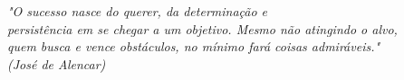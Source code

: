 \begin{epigrafe}
    \vspace*{\fill}
	\begin{flushright}
		\textit{"O sucesso nasce do querer, da determinação e \\persistência em se chegar a um objetivo. Mesmo não atingindo o alvo, \\quem busca e vence obstáculos, no mínimo fará coisas admiráveis."\\
		(José de Alencar)}
	\end{flushright}
\end{epigrafe}
